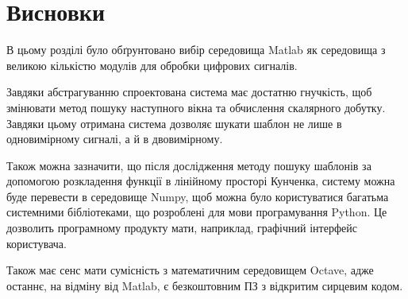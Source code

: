 \section{Висновки}
    В цьому розділі було обґрунтовано вибір середовища Matlab як середовища з великою кількістю модулів для обробки
    цифрових сигналів.

    Завдяки абстрагуванню спроектована система має достатню гнучкість, щоб змінювати метод пошуку наступного вікна та
    обчислення скалярного добутку.
    Завдяки цьому отримана система дозволяє шукати шаблон не лише в одновимірному сигналі, а й в двовимірному.

    Також можна зазначити, що після дослідження методу пошуку шаблонів за допомогою розкладення функції в лінійному
    просторі Кунченка, систему можна буде перевести в середовище Numpy, щоб можна було користуватися багатьма
    системними бібліотеками, що розроблені для мови програмування Python.
    Це дозволить програмному продукту мати, наприклад, графічний інтерфейс користувача.

    Також має сенс мати сумісність з математичним середовищем Octave, адже останнє, на відміну від Matlab, є
    безкоштовним ПЗ з відкритим сирцевим кодом.


